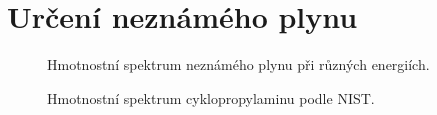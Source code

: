 \documentclass{protokol}
\begin{document}
\header

\section{Určení neznámého plynu}

\begin{figure}[htp]
	\centering
	
	\caption{Hmotnostní spektrum neznámého plynu při různých energiích.}
	\label{fig:unknown-all}
\end{figure}

\begin{figure}[htp]
	\centering
	
	\caption{Hmotnostní spektrum cyklopropylaminu podle NIST.}
	\label{fig:cyclopropylamine-nist}
\end{figure}
\end{document}
